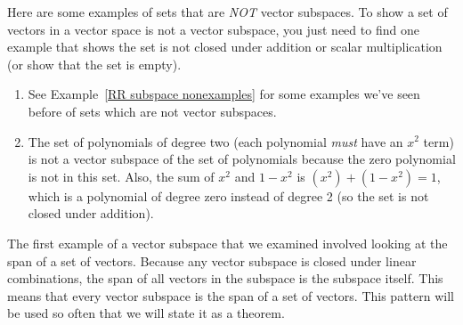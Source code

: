 \begin{example}
Here are some examples of sets that are \emph{NOT} vector subspaces. To show a set of vectors in a vector space is not a vector subspace, you just need to find one example that shows the set is not closed under addition or scalar multiplication (or show that the set is empty).
\begin{enumerate}
        \item See Example~\ref{RR subspace nonexamples} for some examples we've seen before of sets which are not vector subspaces.
	\item The set of polynomials of degree two (each polynomial \emph{must} have an $x^2$ term) is not a vector subspace of the set of polynomials because the zero polynomial is not in this set. Also, the sum of $x^2$ and $1-x^2$ is $(x^2)+(1-x^2)=1$, which is a polynomial of degree zero instead of degree 2 (so the set is not closed under addition).
\end{enumerate}
\end{example}



The first example of a vector subspace that we examined involved looking at the span of a set of vectors. Because any vector subspace is closed under linear combinations, the span of all vectors in the subspace is the subspace itself. This means that every vector subspace is the span of a set of vectors. This pattern will be used so often that we will state it as a theorem.

